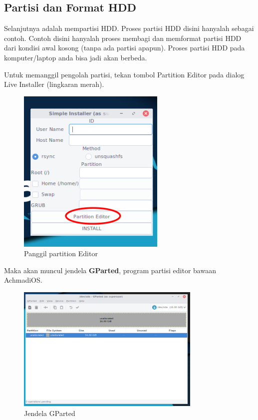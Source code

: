 \documentclass[12pt,]{article}
\begin{document}
	\newpage
	\subsection{Partisi dan Format HDD}
	
	Selanjutnya adalah mempartisi HDD.
	Proses partisi HDD disini hanyalah sebagai contoh.
	Contoh disini hanyalah proses membagi dan memformat partisi HDD dari kondisi awal kosong (tanpa ada partisi apapun).
	Proses partisi HDD pada komputer/laptop anda bisa jadi akan berbeda.
	
	Untuk memanggil pengolah partisi, tekan tombol Partition Editor pada dialog Live Installer (lingkaran merah).
	
	\begin{figure}[!ht]
		\centering
		\includegraphics[width=200pt]{installhdd/step_6}
		\caption{Panggil partition Editor}
	\end{figure}

	Maka akan muncul jendela \textbf{GParted}, program partisi editor bawaan AchmadiOS.
	
	\begin{figure}[!ht]
		\centering
		\includegraphics[width=250pt]{installhdd/step_7}
		\caption{Jendela GParted}
	\end{figure}
\end{document}
